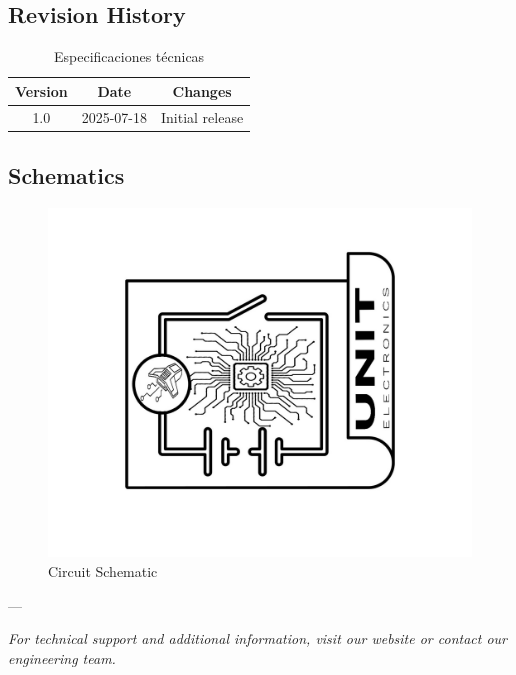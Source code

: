 \documentclass[11pt,a4paper]{article}
\begin{document}
\subsection{Revision History}


\begin{table}[H]
\centering
\small
\begin{tabular}{|c|c|c|}
\hline
Version & Date & Changes \\
\hline
1.0 & 2025-07-18 & Initial release \\
\hline
\end{tabular}
\caption{Especificaciones técnicas}
\end{table}


\subsection{Schematics}


\begin{figure}[H]
\centering
\includegraphics[width=\textwidth]{en_Schematics_icon.jpg}
\caption{Circuit Schematic}
\label{fig:en-Schematics-icon-jpg}
\end{figure}



---

\textit{For technical support and additional information, visit our website or contact our engineering team.}
\end{document}
